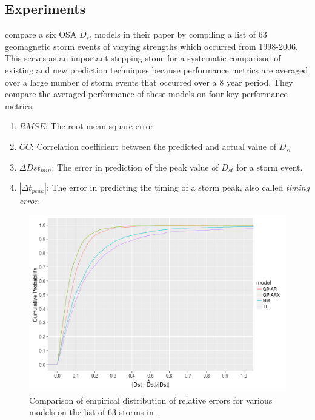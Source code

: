 \documentclass[referee,a4paper,12pt,traditabstract]{swsc}
\begin{document}
\begin{linenumbers}
\section{Experiments} \label{sec:exp}

\citet{Ji2012} compare a six OSA $D_{st}$ models in their paper by compiling a list of 63 geomagnetic storm events of varying strengths which occurred from 1998-2006. This serves as an important stepping stone for a systematic comparison of existing and new prediction techniques because performance metrics are averaged over a large number of storm events that occurred over a 8 year period. They compare the averaged performance of these models on four key performance metrics.

\begin{enumerate}
    \item $RMSE$: The root mean square error
    \item $CC$: Correlation coefficient between the predicted and actual value of $D_{st}$
    \item $\Delta Dst_{min}$: The error in prediction of the peak value of $D_{st}$ for a storm event.
    \item $|\Delta t_{peak}|$: The error in predicting the timing of a storm peak, also called \emph{timing error}. 
\end{enumerate}


\begin{figure}
   \centering
   \includegraphics[width=\textwidth]{Compare_RelProb.png}
   \caption{Comparison of empirical distribution of relative errors for various models on the list of 63 storms in \citet{Ji2012}.}
   \label{fig:relprob}
\end{figure}



\end{linenumbers}
\end{document}
